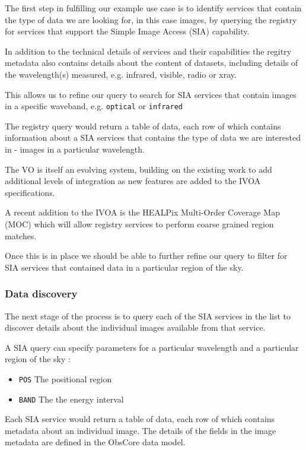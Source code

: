 \documentclass{article}
\begin{document}
The first step in fulfilling our example use case is to identify services that
contain the type of data we are looking for, in this case images, by querying
the registry for services that support the Simple Image Access (SIA)
capability.

In addition to the technical details of services and their capabilities the
regitry metadata also contains details about the content of datasets, including
details of the wavelength(s) measured, e.g. infrared, visible, radio or xray.

This allows us to refine our query to search for SIA services that contain
images in a specific waveband, e.g. \texttt{optical} or \texttt{infrared}

The registry query would return a table of data, each row of which contains
information about a SIA services that contains the type of data we are
interested in - images in a particular wavelength.

The VO is itself an evolving system, building on the existing work to add
additional levels of integration as new features are added to the IVOA
specifications.

A recent addition to the IVOA is the HEALPix Multi-Order Coverage Map (MOC)
which will allow registry services to perform coarse grained region matches.

Once this is in place we should be able to further refine our query to filter
for SIA services that contained data in a particular region of the sky.

\subsubsection{Data discovery}

The next stage of the process is to query each of the SIA services in the list
to discover details about the individual images available from that service.

\noindent
A SIA query can specify parameters for a particular wavelength and a particular
region of the sky :
\begin{itemize}
  \item \texttt{POS}  The positional region
  \item \texttt{BAND} The the energy interval
\end{itemize}

Each SIA service would return a table of data, each row of which contains
metadata about an individual image. The details of the fields in the
image metadata are defined in the ObsCore
data model.
\end{document}
